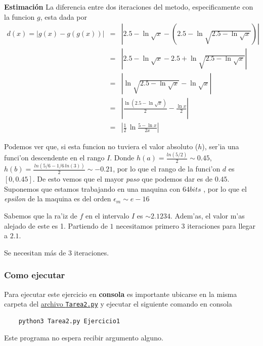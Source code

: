 \documentclass[11pt]{article}
\begin{document}
	\textbf{Estimaci\'on} La diferencia entre dos iteraciones del metodo,
	especificamente con la funcion \(g\), esta dada por \begin{eqnarray*}
		d(x) = \left| g(x) - g(g(x)) \right| &=& \left| 2.5-\ln\sqrt x - \left(2.5 - \ln\sqrt{2.5 - \ln\sqrt x} \right)\right| \\
		    &=& \left| 2.5-\ln\sqrt x - 2.5 + \ln\sqrt{2.5 - \ln\sqrt x} \right| \\
		    &=& \left| \ln\sqrt{2.5 - \ln\sqrt x} -\ln\sqrt x \right| \\
		    &=& \left| \frac{\ln(2.5 - \ln\sqrt x)}{2} - \frac{\ln x}{2} \right| \\
		    &=& \left| \frac{1}{2} \, \ln\frac{5- \ln x}{2x}\right|
	\end{eqnarray*}

	Podemos ver que, si esta funcion no tuviera el valor absoluto (\(h\)),
	ser'ia una funci'on descendente en el rango \(I\). Donde
	\(h(a) = \frac{ln(5/2)}{2} \sim 0.45\),
	\(h(b) = \frac{\, ln(5/6 - 1/6 \, ln(3))}{2} \sim -0.21\), por lo que el
	rango de la funci'on \(d\) es \([0, 0.45]\). De esto vemos que el mayor
	\emph{paso} que podemos dar es de \(0.45\). Suponemos que estamos
	trabajando en una maquina con \(64 bits\) , por lo que el \emph{epsilon}
	de la maquina es del orden \(\epsilon_m \sim e-16\)

	Sabemos que la ra'iz de \(f\) en el intervalo \(I\) es \(\sim 2.1234\).
	Adem'as, el valor m'as alejado de este es 1. Partiendo de \(1\)
	necesitamos primero 3 iteraciones para llegar a \(2.1\).

	Se necesitan m\'as de 3 iteraciones.

		\hypertarget{como-ejecutar}{%
	\subsubsection{Como ejecutar}\label{como-ejecutar}}

	Para ejecutar este ejercicio en \textbf{consola} es importante ubicarse
	en la misma carpeta del
	\href{https://github.com/BenchHPZ/UG-Compu/blob/master/MN/Tareas/T2/Tarea2.py}{archivo
	\texttt{Tarea2.py}} y ejecutar el siguiente comando en consola

	\begin{verbatim}
	python3 Tarea2.py Ejercicio1
	\end{verbatim}

	Este programa no espera recibir argumento alguno.
\end{document}
